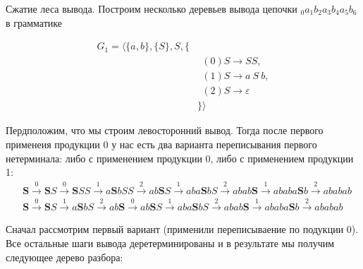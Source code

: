 \begin{example}
  Сжатие леса вывода.
  Построим несколько деревьев вывода цепочки $_0a_1b_2a_3b_4a_5b_6$ в грамматике

  \begin{align*}
   G_1 = \langle \{a,b\}, \{S\},  S, \{ & \\
       & \ \ (0) S \to S S, \\
       & \ \ (1) S \to a \ S \ b, \\
       & \ \ (2) S \to \varepsilon \\
  & \}  \rangle
  \end{align*}

Пердположим, что мы строим левосторонний вывод.
Тогда после первого применеия продукции 0 у нас есть два варианта переписывания первого нетерминала: либо с применением продукции 0, либо с применением продукции 1:
\begin{align*}
&\textbf{S} \xrightarrow{0} \textbf{S}S \xrightarrow{0} \textbf{S}SS \xrightarrow{1} a\textbf{S}bSS \xrightarrow{2} ab\textbf{S}S \xrightarrow{1} aba\textbf{S}bS \xrightarrow{2} abab\textbf{S} \xrightarrow{1} ababa\textbf{S}b \xrightarrow{2} ababab
\\
&\textbf{S} \xrightarrow{0} \textbf{S}S \xrightarrow{1} a\textbf{S}bS \xrightarrow{2} ab\textbf{S} \xrightarrow{0} ab\textbf{S}S \xrightarrow{1} aba\textbf{S}bS \xrightarrow{2} abab\textbf{S} \xrightarrow{1} ababa\textbf{S}b \xrightarrow{2} ababab
\end{align*}

Сначал рассмотрим первый вариант (применили переписываение по подукции 0).
Все остальные шаги вывода деретерминированы и в результате мы получим следующее дерево разбора:

\begin{center}
\end{center}
\end{example}
